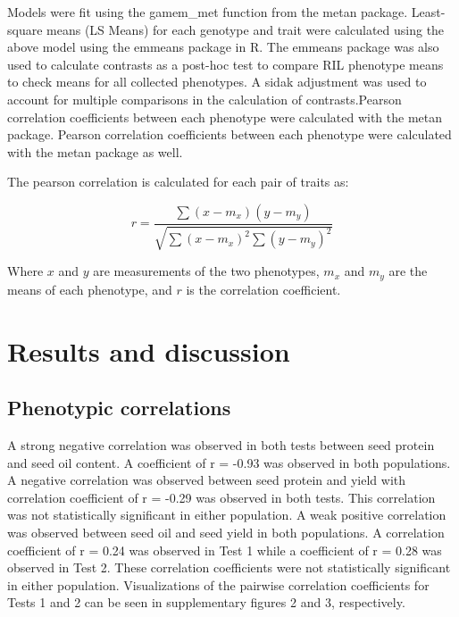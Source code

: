 \documentclass[Agronomy,article,submit,moreauthors,pdftex]{mdpi}
\begin{document}
Models were fit using the gamem\_met function from the metan
package\citep{olivotoMetanPackageMultienvironment2020}. Least-square
means (LS Means) for each genotype and trait were calculated using the
above model using the emmeans
package\citep{lenthEmmeansEstimatedMarginal2022} in R. The emmeans
package was also used to calculate contrasts as a post-hoc test to
compare RIL phenotype means to check means for all collected phenotypes.
A sidak adjustment was used to account for multiple comparisons in the
calculation of contrasts.Pearson correlation coefficients between each
phenotype were calculated with the metan package. Pearson correlation
coefficients between each phenotype were calculated with the metan
package as well.

The pearson correlation is calculated for each pair of traits as:

\[r = \frac{\sum{(x-m_x)(y-m_y)}}{\sqrt{\sum{(x-m_x)^2}\sum{(y-m_y)^2}}}\]

Where \(x\) and \(y\) are measurements of the two phenotypes, \(m_x\)
and \(m_y\) are the means of each phenotype, and \(r\) is the
correlation coefficient.

\hypertarget{results-and-discussion}{%
\section{Results and discussion}\label{results-and-discussion}}

\hypertarget{phenotypic-correlations}{%
\subsection{Phenotypic correlations}\label{phenotypic-correlations}}

A strong negative correlation was observed in both tests between seed
protein and seed oil content. A coefficient of r = -0.93 was observed in
both populations. A negative correlation was observed between seed
protein and yield with correlation coefficient of r = -0.29 was observed
in both tests. This correlation was not statistically significant in
either population. A weak positive correlation was observed between seed
oil and seed yield in both populations. A correlation coefficient of r =
0.24 was observed in Test 1 while a coefficient of r = 0.28 was observed
in Test 2. These correlation coefficients were not statistically
significant in either population. Visualizations of the pairwise
correlation coefficients for Tests 1 and 2 can be seen in supplementary
figures 2 and 3, respectively.
\end{document}
